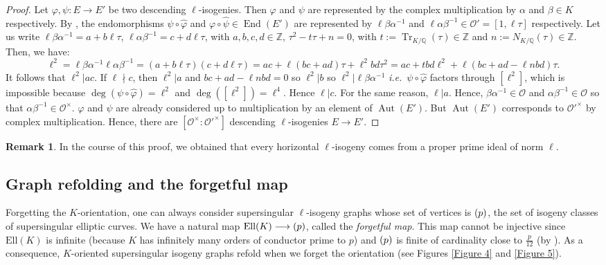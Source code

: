 \documentclass[a4paper,10pt,notitlepage]{report}
\theoremstyle{definition}
\theoremstyle{plain}
\theoremstyle{definition}
\newtheorem{Remark}[Definition]{Remark}
\newcommand{\ie}{\emph{i.e.}\ }
\newcommand{\Z}{\mathbb{Z}}
\newcommand{\Q}{\mathbb{Q}}
\newcommand{\mO}{\mathcal{O}}
\renewcommand{\(}{\left(}
\renewcommand{\)}{\right)}
\DeclareMathOperator{\End}{End}
\DeclareMathOperator{\Aut}{Aut}
\DeclareMathOperator{\Tr}{Tr}
\let\SS\relax
\DeclareMathOperator{\SS}{SS}
\begin{document}
\begin{proof}
Let $\varphi, \psi : E\longrightarrow E'$ be two descending $\ell$-isogenies. Then $\varphi$ and $\psi$ are represented by the complex multiplication by $\alpha$ and $\beta\in K$ respectively.  By \cite[exercise 6.10.(b)]{Silverman1},  the endomorphisms $\psi\circ\widehat{\varphi}$ and $\varphi\circ\widehat{\psi}\in\End(E')$ are represented by $\ell\beta\alpha^{-1}$ and $\ell\alpha\beta^{-1}\in\mO'=[1,\ell\tau]$ respectively.  Let us write $\ell\beta\alpha^{-1}=a+b\ell\tau$, $\ell\alpha\beta^{-1}=c+d\ell\tau$, with $a,b,c,d\in\Z$, $\tau^2-t\tau+n=0$, with $t:=\Tr_{K/\Q}(\tau)\in \Z$ and $n:=N_{K/\Q}(\tau)\in \Z$.  Then, we have:
\[\ell^2=\ell\beta\alpha^{-1}\ell\alpha\beta^{-1}=(a+b\ell\tau)(c+d\ell\tau)=ac+\ell(bc+ad)\tau+\ell^2bd\tau^2=ac+tbd\ell^2+\ell(bc+ad-\ell n bd)\tau.\]
It follows that $\ell^2|ac$.  If $\ell\nmid c$, then $\ell^2|a$ and $bc+ad-\ell n bd=0$ so $\ell^2|b$ so $\ell^2|\ell\beta\alpha^{-1}$ \ie  $\psi\circ\widehat{\varphi}$ factors through $[\ell^2]$, which is impossible because $\deg(\psi\circ\widehat{\varphi})=\ell^2$ and $\deg([\ell^2])=\ell^4$. Hence $\ell|c$. For the same reason, $\ell|a$. Hence, $\beta\alpha^{-1}\in\mO$ and $\alpha\beta^{-1}\in\mO$ so that $\alpha\beta^{-1}\in\mO^\times$.  $\varphi$ and $\psi$ are already considered up to multiplication by an element of $\Aut(E')$. But $\Aut(E')$ corresponds to $\mO'^\times$ by complex multiplication. Hence, there are $[\mO^\times:\mO'^\times]$ descending $\ell$-isogenies $E\longrightarrow E'$.
\end{proof}

\begin{Remark}\label{Remark 2}
In the course of this proof, we obtained that every horizontal $\ell$-isogeny comes from a proper prime ideal of norm $\ell$.
\end{Remark}

\subsection{Graph refolding and the forgetful map}

Forgetting the $K$-orientation, one can always consider supersingular $\ell$-isogeny graphs whose set of vertices is $\SS(p)$, the set of isogeny classes of supersingular elliptic curves. We have a natural map $\mbox{Ell}(K)\longrightarrow\SS(p)$, called the \emph{forgetful map}. This map cannot be injective since $\mbox{Ell}(K)$ is infinite (because $K$ has infinitely many orders of conductor prime to $p$) and $\SS(p)$ is finite of cardinality close to $\frac{p}{12}$ (by \cite[Theorem V.4.1.(c)]{Silverman1}).  As a consequence, $K$-oriented supersingular isogeny graphs refold when we forget the orientation (see Figures \ref{Figure 4} and \ref{Figure 5}).
\end{document}
